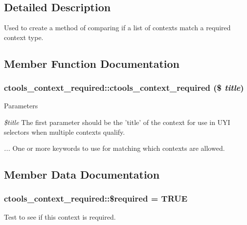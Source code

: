 \subsection{Detailed Description}
Used to create a method of comparing if a list of contexts match a required context type. 

\subsection{Member Function Documentation}
\hypertarget{classctools__context__required_a91ae748df7bbdf6b3651f28c00f365cf}{
\subsubsection[{ctools\_\-context\_\-required}]{\setlength{\rightskip}{0pt plus 5cm}ctools\_\-context\_\-required::ctools\_\-context\_\-required (\$ {\em title})}}
\label{classctools__context__required_a91ae748df7bbdf6b3651f28c00f365cf}

\begin{DoxyParams}{Parameters}
\item[{\em \$title}]The first parameter should be the 'title' of the context for use in UYI selectors when multiple contexts qualify. \item[{\em ...}]One or more keywords to use for matching which contexts are allowed. \end{DoxyParams}


\subsection{Member Data Documentation}
\hypertarget{classctools__context__required_a392adc1ecb046f17494d848d9fd02a66}{
\subsubsection[{\$required}]{\setlength{\rightskip}{0pt plus 5cm}ctools\_\-context\_\-required::\$required = TRUE}}
\label{classctools__context__required_a392adc1ecb046f17494d848d9fd02a66}
Test to see if this context is required. 


